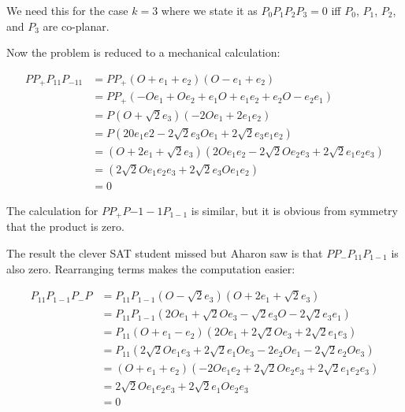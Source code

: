 \documentclass[11pt,fleqn]{article}
\begin{document}
We need this for the case \(k = 3\) where we state it
as \(P_0P_1P_2P_3 = 0\) iff \(P_0\), \(P_1\), \(P_2\),
and \(P_3\) are co-planar.

Now the problem is reduced to a mechanical calculation:

\begin{align*}
PP_+P_{11}P_{-11} &= PP_+(O + e_1 + e_2)(O - e_1 + e_2)\\
    &= PP_+(-Oe_1 + Oe_2 + e_1O + e_1e_2 + e_2O - e_2e_1)\\
	&= P(O + \sqrt{2}e_3)(-2Oe_1 + 2e_1 e_2)\\
	&= P(20e_1e2 - 2\sqrt{2} e_3Oe_1 + 2\sqrt{2} e_3e_1e_2)\\
	&= (O + 2e_1 + \sqrt{2}e_3)
		(2Oe_1e_2 - 2\sqrt{2} Oe_2e_3 + 2\sqrt{2}e_1e_2e_3)\\
	&= (2\sqrt{2}Oe_1e_2e_3 + 2\sqrt{2}e_3Oe_1e_2)\\
	&= 0
\end{align*}

The calculation for \(PP_+P{-1-1}P_{1-1}\) is similar, but it
is obvious from symmetry that the product is zero.

The result the clever SAT student missed but Aharon saw is that 
\(PP_-P_{11}P_{1-1}\) is also zero. Rearranging terms makes
the computation easier:

\begin{align*}
P_{11}P_{1-1}P_-P
	&= P_{11}P_{1-1}(O - \sqrt{2}e_3)(O + 2e_1 + \sqrt{2}e_3)\\
	&= P_{11}P_{1-1}(2Oe_1 + \sqrt{2}Oe_3 - \sqrt{2}e_3O - 2\sqrt{2}e_3e_1)\\
	&= P_{11}(O + e_1 - e_2)(2Oe_1 + 2\sqrt{2}Oe_3 + 2\sqrt{2}e_1e_3)\\
	&= P_{11}(2\sqrt{2}Oe_1e_3 + 2\sqrt{2}e_1Oe_3
		- 2e_2Oe_1 - 2\sqrt{2}e_2Oe_3)\\
	&= (O + e_1 + e_2)(-2Oe_1e_2 + 2\sqrt{2}Oe_2e_3 + 2\sqrt{2}e_1e_2e_3)\\
	&= 2\sqrt{2}Oe_1e_2e_3 + 2\sqrt{2}e_1Oe_2e_3\\
	&= 0
\end{align*}
\end{document}
